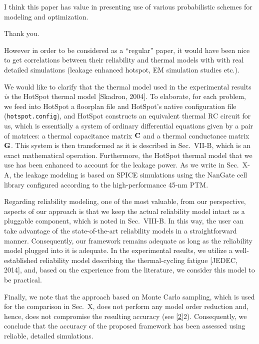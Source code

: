 \begin{reviewer}
I think this paper has value in presenting use of various probabilistic schemes
for modeling and optimization.
\end{reviewer}

\begin{authors}
  Thank you.
\end{authors}

\begin{reviewer}
However in order to be considered as a ``regular'' paper, it would have been
nice to get correlations between their reliability and thermal models with with
real detailed simulations (leakage enhanced hotspot, EM simulation studies
etc.).
\end{reviewer}

\begin{authors}
We would like to clarify that the thermal model used in the experimental results
\emph{is} the HotSpot thermal model [Skadron, 2004]. To elaborate, for each
problem, we feed into HotSpot a floorplan file and HotSpot's native
configuration file (\texttt{hotspot.config}), and HotSpot constructs an
equivalent thermal RC circuit for us, which is essentially a system of ordinary
differential equations given by a pair of matrices: a thermal capacitance matrix
$\mathbf{C}$ and a thermal conductance matrix $\mathbf{G}$. This system is then
transformed as it is described in Sec.~VII-B, which is an exact mathematical
operation. Furthermore, the HotSpot thermal model that we use has been enhanced
to account for the leakage power. As we write in Sec.~X-A, the leakage modeling
is based on SPICE simulations using the NanGate cell library configured
according to the high-performance 45-nm PTM.

Regarding reliability modeling, one of the most valuable, from our perspective,
aspects of our approach is that we keep the actual reliability model intact as a
pluggable component, which is noted in Sec.~VIII-B. In this way, the user can
take advantage of the state-of-the-art reliability models in a straightforward
manner. Consequently, our framework remains adequate as long as the reliability
model plugged into it is adequate. In the experimental results, we utilize a
well-established reliability model describing the thermal-cycling fatigue
[JEDEC, 2014], and, based on the experience from the literature, we consider
this model to be practical.

Finally, we note that the approach based on Monte Carlo sampling, which is used
for the comparison in Sec.~X, does not perform any model order reduction and,
hence, does not compromise the resulting accuracy (see \cref{2}{2}).
Consequently, we conclude that the accuracy of the proposed framework has been
assessed using reliable, detailed simulations.

\begin{actions}
\end{actions}
\end{authors}

